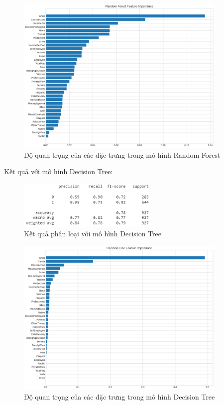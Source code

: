 \documentclass[14pt, a4paper]{article}
\numberwithin{equation}{section}
\numberwithin{figure}{section}
\numberwithin{dl}{section}
\numberwithin{md}{section}
\numberwithin{bd}{section}
\numberwithin{dn}{section}
\numberwithin{hq}{section}
\begin{document}
    \begin{figure}[h!]
        \centering
        \includegraphics[width=0.9\textwidth]{figures/Random_Forest_Feature_Importance.png}
        \caption{Độ quan trọng của các đặc trưng trong mô hình Random Forest}
    \end{figure}

    Kết quả với mô hình Decision Tree:

    \begin{figure}[h!]
        \centering
        \includegraphics[width=0.6\textwidth]{figures/Decision_Tree_Report.png}
        \caption{Kết quả phân loại với mô hình Decision Tree}
    \end{figure}

    \begin{figure}[h!]
        \centering
        \includegraphics[width=0.9\textwidth]{figures/Decision_Tree_Feature_Importance.png}
        \caption{Độ quan trọng của các đặc trưng trong mô hình Decision Tree}
    \end{figure}
\end{document}
